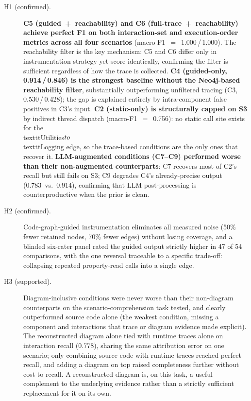 \begin{description}
  \item[H1 (confirmed).] \textbf{C5 (guided~+~reachability) and C6
    (full-trace~+~reachability) achieve perfect F1 on both interaction-set
    and execution-order metrics across all four scenarios}
    (macro-F1~$=$~1.000\,/\,1.000). The reachability filter is the key
    mechanism: C5 and C6 differ only in instrumentation strategy yet
    score identically, confirming the filter is sufficient regardless of
    how the trace is collected. \textbf{C4 (guided-only, 0.914\,/\,0.846) is
    the strongest baseline without the Neo4j-based reachability filter}, substantially outperforming
    unfiltered tracing (C3, 0.530\,/\,0.428); the gap is explained entirely
    by intra-component false positives in C3's input.
    \textbf{C2 (static-only) is structurally capped on S3} by indirect
    thread dispatch (macro-F1~$=$~0.756): no static call site exists for
    the \\texttt{Utilities}$\\to$\\texttt{Logging} edge, so the trace-based
    conditions are the only ones that recover it.
    \textbf{LLM-augmented conditions (C7--C9) performed worse than
    their non-augmented counterparts}: C7 recovers most of C2's recall but
    still fails on S3; C9 degrades C4's already-precise output
    (0.783~vs.~0.914), confirming that LLM post-processing is
    counterproductive when the prior is clean.

  \item[H2 (confirmed).] Code-graph-guided instrumentation eliminates
    all measured noise (50\% fewer retained nodes, 70\% fewer edges)
    without losing coverage, and a blinded six-rater panel rated the
    guided output strictly higher in 47 of 54 comparisons, with the one
    reversal traceable to a specific trade-off: collapsing repeated
    property-read calls into a single edge.

  \item[H3 (supported).] Diagram-inclusive conditions were never worse
    than their non-diagram counterparts on the scenario-comprehension
    task tested, and clearly outperformed source code alone (the
    weakest condition, missing a component and interactions that trace
    or diagram evidence made explicit). The reconstructed diagram alone
    tied with runtime traces alone on interaction recall (0.778),
    sharing the same attribution error on one scenario; only combining
    source code with runtime traces reached perfect recall, and adding
    a diagram on top raised completeness further without cost to
    recall. A reconstructed diagram is, on this task, a useful
    complement to the underlying evidence rather than a strictly
    sufficient replacement for it on its own.
\end{description}

